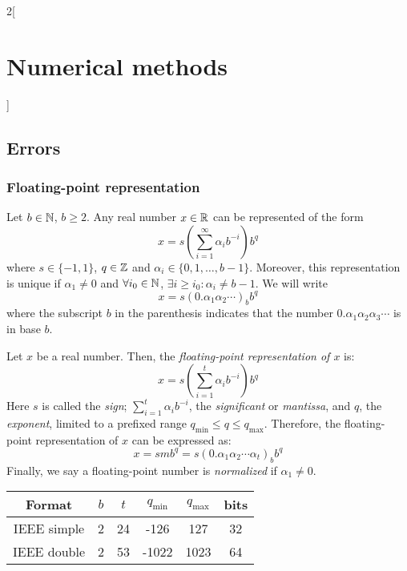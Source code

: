 \documentclass[../../../main.tex]{subfiles}
\begin{document}
\begin{multicols}{2}[\section{Numerical methods}]
  \subsection{Errors}
  \subsubsection{Floating-point representation}
  \begin{theorem}
    Let $b\in\mathbb{N}$, $b\geq 2$. Any real number $x\in\mathbb{R}$ can be represented of the form
    \begin{equation*}
      x=s\left(\sum_{i=1}^\infty\alpha_ib^{-i}\right)b^q
    \end{equation*} where $s\in\{-1,1\}$, $q\in\mathbb{Z}$ and $\alpha_i\in\{0,1,\ldots,b-1\}$. Moreover, this representation is unique if $\alpha_1\ne0$ and $\forall i_0\in\mathbb{N}$, $\exists i\geq i_0:\alpha_i\ne b-1$. We will write $$x=s(0.\alpha_1\alpha_2\cdots)_bb^q$$ where the subscript $b$ in the parenthesis indicates that the number $0.\alpha_1\alpha_2\alpha_3\cdots$ is in base $b$.
  \end{theorem}
  \begin{definition}
    Let $x$ be a real number. Then, the \textit{floating-point representation of $x$} is: $$x=s\left(\sum_{i=1}^t\alpha_ib^{-i}\right)b^q$$ Here $s$ is called the \textit{sign}; $\sum_{i=1}^t\alpha_ib^{-i}$, the \textit{significant} or \textit{mantissa}, and $q$, the \textit{exponent}, limited to a prefixed range $q_\text{min}\leq q\leq q_\text{max}$. Therefore, the floating-point representation of $x$ can be expressed as: $$x=smb^q=s(0.\alpha_1\alpha_2\cdots\alpha_t)_bb^q$$ Finally, we say a floating-point number is \textit{normalized} if $\alpha_1\ne0$.
  \end{definition}
  \begin{center}
    \begin{minipage}{\linewidth}
      \centering
      \begin{tabular}{c|ccccc}
        Format      & $b$ & $t$ & $q_\text{min}$ & $q_\text{max}$ & bits \\
        \hline\hline
        IEEE simple & 2   & 24  & -126           & 127            & 32   \\
        IEEE double & 2   & 53  & -1022          & 1023           & 64

\end{tabular}
\end{minipage}
\end{center}
\end{multicols}
\end{document}
